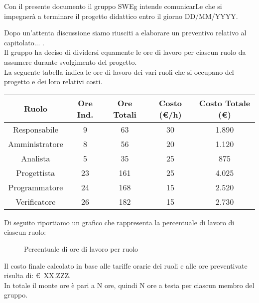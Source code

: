 Con il presente documento il gruppo SWEg intende comunicarLe che si impegner\`a a terminare il progetto didattico entro il giorno DD/MM/YYYY.

Dopo un'attenta discussione siamo riusciti a elaborare un preventivo relativo al capitolato... .\\
Il gruppo ha deciso di dividersi equamente le ore di lavoro per ciascun ruolo da assumere durante svolgimento del progetto.\\
La seguente tabella indica le ore di lavoro dei vari ruoli che si occupano del progetto e dei loro relativi costi.

\vspace{0.5cm}

\begin{table}[h]
\centering
\begin{tabular}{|c|c|c|c|c|}
\hline
Ruolo & Ore Ind. & Ore Totali & Costo (\euro/h) & Costo Totale (\euro) \\
\hline
Responsabile & 9 & 63 & 30 & 1.890 \\
\hline
Amministratore & 8 & 56 & 20 & 1.120 \\
\hline
Analista & 5 & 35 & 25 & 875 \\
\hline
Progettista & 23 & 161 & 25 & 4.025 \\
\hline
Programmatore & 24 & 168 & 15 & 2.520 \\
\hline
Verificatore & 26 & 182 & 15 & 2.730 \\
\hline
\end{tabular}
\end{table}

\newpage
Di seguito riportiamo un grafico che rappresenta la percentuale di lavoro di ciascun ruolo:
\vspace{0.5cm}

\begin{figure}[h]
\centering
{}
\caption{Percentuale di ore di lavoro per ruolo}
\end{figure}

Il costo finale calcolato in base alle tariffe orarie dei ruoli e alle ore preventivate risulta di: \euro~XX.ZZZ.\\
In totale il monte ore \`e pari a N ore, quindi N ore a testa per ciascun membro del gruppo.